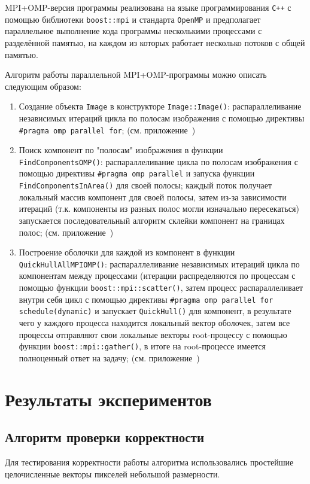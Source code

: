 \documentclass[12pt]{article}
\begin{document}
MPI+OMP-версия программы реализована на языке программирования \texttt{C++} с помощью библиотеки \texttt{boost::mpi} и стандарта \texttt{OpenMP} и предполагает параллельное выполнение кода программы несколькими процессами с разделённой памятью, на каждом из которых работает несколько потоков с общей памятью.

Алгоритм работы параллельной MPI+OMP-программы можно описать следующим образом:

\begin{enumerate}
    \item Создание объекта \texttt{Image} в конструкторе \texttt{Image::Image()}: распараллеливание независимых итераций цикла по полосам изображения с помощью директивы \texttt{\#pragma omp parallel for}; (см. приложение~)
    \item Поиск компонент по "полосам" изображения в функции \texttt{FindComponentsOMP()}: распараллеливание цикла по полосам изображения с помощью директивы \texttt{\#pragma omp parallel} и запуска функции \texttt{FindComponentsInArea()} для своей полосы; каждый поток получает локальный массив компонент для своей полосы, затем из-за зависимости итераций (т.к. компоненты из разных полос могли изначально пересекаться) запускается последовательный алгоритм склейки компонент на границах полос; (см. приложение~)
    \item Построение оболочки для каждой из компонент в функции \texttt{QuickHullAllMPIOMP()}: распараллеливание независимых итераций цикла по компонентам между процессами (итерации распределяются по процессам с помощью функции \texttt{boost::mpi::scatter()}, затем процесс распараллеливает внутри себя цикл с помощью директивы \texttt{\#pragma omp parallel for schedule(dynamic)} и запускает \texttt{QuickHull()} для компонент, в результате чего у каждого процесса находится локальный вектор оболочек, затем все процессы отправляют свои локальные векторы root-процессу с помощью функции \texttt{boost::mpi::gather()}, в итоге на root-процессе имеется полноценный ответ на задачу; (см. приложение~)
\end{enumerate}

\newpage

\section{Результаты экспериментов}
\subsection{Алгоритм проверки корректности}
Для тестирования корректности работы алгоритма использовались простейшие целочисленные векторы пикселей небольшой размерности. 
\end{document}

